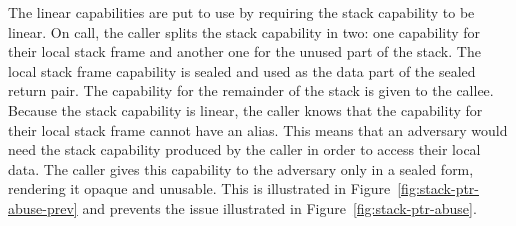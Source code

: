 \documentclass[acmsmall,screen]{acmart}\settopmatter{}
\begin{document}
The linear capabilities are put to use by requiring the stack capability to be linear.
On call, the caller splits the stack capability in two: one capability for their local stack frame and another one for the unused part of the stack.
The local stack frame capability is sealed and used as the data part of the sealed return pair.
The capability for the remainder of the stack is given to the callee.
Because the stack capability is linear, the caller knows that the capability for their local stack frame cannot have an alias.
This means that an adversary would need the stack capability produced by the caller in order to access their local data.
The caller gives this capability to the adversary only in a sealed form, rendering it opaque and unusable.
This is illustrated in Figure~\ref{fig:stack-ptr-abuse-prev} and prevents the issue illustrated in Figure~\ref{fig:stack-ptr-abuse}.
\end{document}
